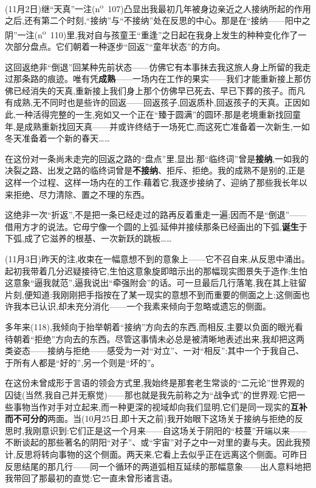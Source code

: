 (11月2日)继“天真”一注(n\textsuperscript{o}~107)凸显出我最初几年被身边亲近之人接纳所起的作用之后,还有第二个时刻,“接纳”与“不接纳”处在反思的中心。那是在“接纳——阳中之阴”一注(n\textsuperscript{o}~110)里,我对自与孩童王“重逢”之日起在我身上发生的种种变化作了一次部分盘点。它们朝着一种逐步“回返”“童年状态”的方向。

\dmark{}这回返绝非“倒退”回某种先前状态——仿佛它有本事抹去我这旅人身上所留的我走过那条路的痕迹。唯有凭\textbf{成熟}——一场内在工作的果实——我们才能重新接上那仿佛已经消失的天真,重新接上我们身上那个仿佛早已死去、早已下葬的孩子。而凡有成熟,无不同时也是些许的回返——回返孩子,回返质朴,回返孩子的天真。正因如此,一种活得完整的一生,宛如又一个正在“臻于圆满”的圆环;那是老境重新找回童年,是成熟重新找回天真——并或许终结于一场死亡,而这死亡准备着一次新生,一如冬天准备着一个新的春天……

在这份对一条尚未走完的回返之路的“盘点”里,显出:那“临终词”曾是\textbf{接纳},一如我的决裂之路、出发之路的临终词曾是\textbf{不接纳}、拒斥、拒绝。我的成熟不是别的,正是这样一个过程、这样一场内在的工作:藉着它,我逐步接纳了、迎纳了那些我长年以来拒绝、尽力清除、置之不理的东西。

这绝非一次“折返”,不是把一条已经走过的路再反着重走一遍;因而不是“倒退”——借用方才的说法。它毋宁像一个圆的上弧:延伸并接续那条已经画出的下弧,\textbf{诞生}于下弧,成了它滋养的根基、一次新跃的跳板……

(11月3日)昨天的注,收束在一幅意想不到的意象上——它不召自来,从反思中涌出。起初我带着几分迟疑接待它,生怕这意象旋即暗示出的那幅现实图景失于造作;生怕这意象“逼我就范”,逼我说出“牵强附会”的话。可一旦最后几行落笔,我在其上驻留片刻,便知道:我刚刚把手指按在了某一现实的意想不到而重要的侧面之上;这侧面也许我本已认识,却未充分消化——一个我素来倾向于忽略或遗忘的侧面。

\dmark{}多年来(118),我倾向于抬举朝着“接纳”方向去的东西,而相反,主要以负面的眼光看待朝着“拒绝”方向去的东西。尽管这事情未必总是被清晰地表述出来,我却把这两类姿态——接纳与拒绝——感受为一对“对立”、一对“相反”:其中一个于我自己、于所有人都是“好的”,另一个则是“坏的”。

在这份未曾成形于言语的领会方式里,我始终是那套老生常谈的“二元论”世界观的囚徒(当然,我自己并无察觉)——那也就是我先前称之为“战争式”的世界观:它把一些事物当作对手对立起来,而一种更深的视域却向我们显明,它们是同一现实的\textbf{互补而不可分的}两面。当(10月25日,即十天之前)我开始眼下这场关于接纳与拒绝的反思时,我刚意识到:它们正是这一个月来——自这场关于阴阳的“枝蔓”开端以来——不断谈起的那些著名的阴阳“对子”、或“宇宙”对子之中一对里的妻与夫。因此我预计,反思将转向事物的这个侧面。两天来,它看上去似乎正在远离这个侧面。可昨日反思结尾的那几行——同一个循环的两道弧相互延续的那幅意象——出人意料地把我带回了那最初的直觉:它一直未曾形诸言语。

